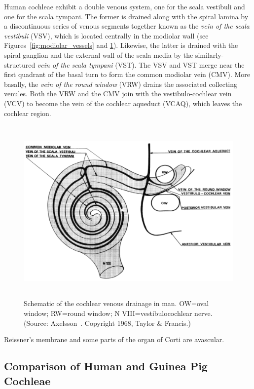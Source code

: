 Human cochleae exhibit a double venous system, one for the scala vestibuli and
one for the scala tympani. The former is drained along with the spiral lamina by
a discontinuous series of venous segments together known as the \emph{vein of
the scala vestibuli} (VSV), which is located centrally in the modiolar wall (see
Figures~\ref{fig:modiolar_vessels} and \ref{fig:venous_drainage}). Likewise, the
latter is drained with the spiral ganglion and the external wall of the scala
media by the similarly-structured \emph{vein of the scala tympani} (VST). The
VSV and VST merge near the first quadrant of the basal turn to form the common
modiolar vein (CMV). More basally, the \emph{vein of the round window} (VRW)
drains the associated collecting venules. Both the VRW and the CMV join with the
vestibulo-cochlear vein (VCV) to become the vein of the cochlear aqueduct
(VCAQ), which leaves the cochlear region.

\begin{figure}
	\centering
	\includegraphics[height=9.2cm]{Background/modiovein}
	\caption[Schematic of the cochlear venous drainage in man]{Schematic of the
	cochlear venous drainage in man. OW=oval window; RW=round window; N
	VIII=vestibulocochlear nerve. (Source: Axelsson~\cite{axelsson1968}. Copyright
	\textcopyright{} 1968, Taylor \& Francis.)}
	\label{fig:venous_drainage}
\end{figure}

Reissner's membrane and some parts of the organ of Corti are avascular.

\subsection{Comparison of Human and Guinea Pig Cochleae}
\label{sect:comparison_of_species}

